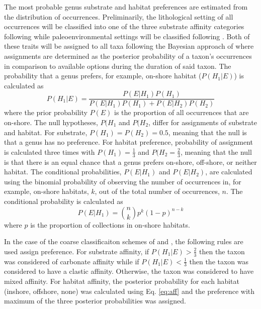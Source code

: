 \documentclass[12pt,letterpaper]{article}
\begin{document}
The most probable genus substrate and habitat preferences are estimated from the distribution of occurrences. Preliminarily, the lithological setting of all occurrences will be classified into one of the three substrate affinity categories following \citet{Foote2006} while paleoenvironmental settings will be classified following \citet{Kiessling2007}. Both of these traits will be assigned to all taxa following the Bayesian approach of \citet{Simpson2009} where assignments are determined as the posterior probability of a taxon's occurrences in comparison to available options during the duration of said taxon. The probability that a genus prefers, for example, on-shore habitat (\(P(H_{1}|E)\)) is calculated as
\begin{equation}
  P(H_{1}|E) = \frac{P(E|H_{1})P(H_{1})}{P(E|H_{1})P(H_{1}) + P(E|H_{2})P(H_{2})}
  \label{eq:aff}
\end{equation}
where the prior probability \(P(E)\) is the proportion of all occurrences that are on-shore. The null hypotheses, \(P(H_{1}\) and \(P(H_{2}\), differ for assignments of substrate and habitat. For substrate, \(P(H_{1}) = P(H_{2}) = 0.5\), meaning that the null is that a genus has no preference. For habitat preference, probability of assignment is calculated three times with \(P(H_{1}) = \frac{1}{3}\) and \(P(H_{2} = \frac{2}{3}\), meaning that the null is that there is an equal chance that a genus prefers on-shore, off-shore, or neither habitat. The conditional probabilities, \(P(E|H_{1})\) and \(P(E|H_{2})\), are calculated using the binomial probability of observing the number of occurrences in, for example, on-shore habitats, \(k\), out of the total number of occurrences, \(n\). The conditional probability is calculated as
\begin{equation}
  P(E|H_{1}) = \binom{n}{k} p^{k}(1 - p)^{n - k}
  \label{eq:condprob}
\end{equation}
where \(p\) is the proportion of collections in on-shore habitats.

In the case of the coarse classificaiton schemes of \citet{Foote2006} and \citet{Kiessling2007}, the following rules are used assign preference. For substrate affinity, if \(P(H_{1}|E) > \frac{2}{3}\) then the taxon was considered of carbonate affinity while if \(P(H_{1}|E) < \frac{1}{3}\) then the taxon was considered to have a clastic affinity. Otherwise, the taxon was considered to have mixed affinity. For habitat affinity, the posterior probability for each habitat (inshore, offshore, none) was calculated using Eq. \ref{eq:aff} and the preference with maximum of the three posterior probabilities was assigned.
\end{document}
